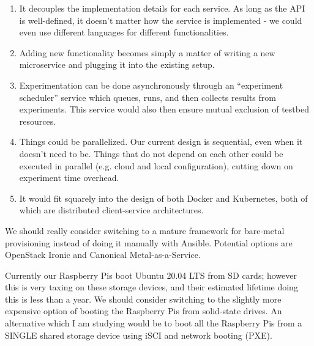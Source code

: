 \begin{description}[wide,style=nextline]
    \begin{enumerate}
        \item It decouples the implementation details for each service.
        As long as the \ac{API} is well-defined, it doesn't matter how the service is implemented - we could even use different languages for different functionalities.
        \item Adding new functionality becomes simply a matter of writing a new microservice and plugging it into the existing setup.
        \item Experimentation can be done asynchronously through an ``experiment scheduler'' service which queues, runs, and then collects results from experiments.
        This service would also then ensure mutual exclusion of testbed resources.
        \item Things could be parallelized.
        Our current design is sequential, even when it doesn't need to be.
        Things that do not depend on each other could be executed in parallel (e.g. cloud and local configuration), cutting down on experiment time overhead.
        \item It would fit squarely into the design of both Docker and Kubernetes, both of which are distributed client-service architectures.
    \end{enumerate}

    \item[OpenStack/Canonical MaaS]
    
    We should really consider switching to a mature framework for bare-metal provisioning instead of doing it manually with Ansible.
    Potential options are OpenStack Ironic and Canonical Metal-as-a-Service.

    \item[Raspberry Pi SSDs]
        
    Currently our Raspberry Pis boot Ubuntu 20.04 LTS from SD cards; however this is very taxing on these storage devices, and their estimated lifetime doing this is less than a year.
    We should consider switching to the slightly more expensive option of booting the Raspberry Pis from solid-state drives.
    An alternative which I am studying would be to boot all the Raspberry Pis from a SINGLE shared storage device using iSCI and network booting (PXE). 

\end{description}

